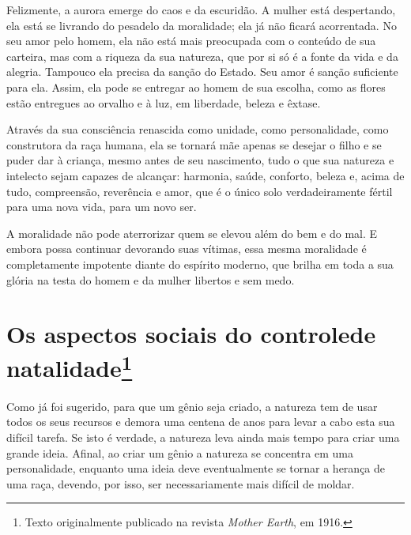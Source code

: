 Felizmente, a aurora emerge do caos e da escuridão. A mulher
está despertando, ela está se livrando do pesadelo da moralidade; ela já
não ficará acorrentada. No seu amor pelo homem, ela não está mais
preocupada com o conteúdo de sua carteira, mas com a riqueza da sua
natureza, que por si só é a fonte da vida e da alegria. Tampouco ela
precisa da sanção do Estado. Seu amor é sanção suficiente para ela.
Assim, ela pode se entregar ao homem de sua escolha, como as flores
estão entregues ao orvalho e à luz, em liberdade, beleza e êxtase.

Através da sua consciência renascida como unidade, como personalidade,\label{renascida}
como construtora da raça humana, ela se tornará mãe apenas se desejar o
filho e se puder dar à criança, mesmo antes de seu nascimento, tudo o
que sua natureza e intelecto sejam capazes de alcançar: harmonia, saúde,
conforto, beleza e, acima de tudo, compreensão, reverência e amor, que é
o único solo verdadeiramente fértil para uma nova vida, para um novo
ser.

A moralidade não pode aterrorizar quem se elevou além do bem e do mal. E
embora possa continuar devorando suas vítimas, essa mesma moralidade é
completamente impotente diante do espírito moderno, que brilha em toda a
sua glória na testa do homem e da mulher libertos e sem medo.

\chapter[Os aspectos sociais do controle de natalidade]{Os aspectos sociais do controle\break de natalidade\footnote{Texto
  originalmente publicado na revista \textit{Mother Earth}, em 1916.}}
\label{ref4}

Como já foi sugerido, para que um gênio seja criado, a natureza tem de
usar todos os seus recursos e demora uma centena de anos para levar a
cabo esta sua difícil tarefa. Se isto é verdade, a natureza leva ainda
mais tempo para criar uma grande ideia. Afinal, ao criar um gênio a
natureza se concentra em uma personalidade, enquanto uma ideia deve
eventualmente se tornar a herança de uma raça, devendo, por isso, ser
necessariamente mais difícil de moldar.

